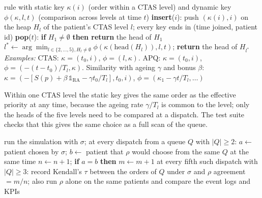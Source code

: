 \begin{algorithm}[H]
\caption{Queue ordered by a queue rule}
\label{alg:queue}
\begin{algorithmic}[1]
\REQUIRE rule with static key $\kappa(i)$ (order within a CTAS level) and dynamic key $\phi(\kappa,l,t)$ (comparison across levels at time $t$)
\STATE \textbf{insert}($i$): push $(\kappa(i),i)$ on the heap $H_l$ of the patient's CTAS level $l$; every key ends in (time joined, patient id)
\STATE \textbf{pop}($t$): \textbf{if} $H_1\neq\emptyset$ \textbf{then return} the head of $H_1$ 
\STATE \quad $l^*\leftarrow\arg\min_{l\in\{2,\dots,5\},H_l\neq\emptyset}\phi(\kappa(\text{head}(H_l)),l,t)$; \textbf{return} the head of $H_{l^*}$
\STATE \textit{Examples:} CTAS: $\kappa=(t_0,i)$, $\phi=(l,\kappa)$. APQ: $\kappa=(t_0,i)$, $\phi=(-(t-t_0)/T_l,\kappa)$. Similarity with ageing $\gamma$ and bonus $\beta$: $\kappa=(-[S(p)+\beta\,\mathbb{1}_{\text{RA}}-\gamma t_0/T_l],t_0,i)$, $\phi=(\kappa_1-\gamma t/T_l,\dots)$
\end{algorithmic}
\end{algorithm}

Within one CTAS level the static key gives the same order as the effective priority at any time, because the ageing rate $\gamma/T_l$ is common to the level; only the heads of the five levels need to be compared at a dispatch. The test suite checks that this gives the same choice as a full scan of the queue.

\begin{algorithm}[H]
\caption{Decision-level fidelity of a similarity index $\sigma$ to a reference rule $\rho$}
\label{alg:fidelity}
\begin{algorithmic}[1]
\STATE run the simulation with $\sigma$; at every dispatch from a queue $Q$ with $|Q|\ge2$:
\STATE \quad $a\leftarrow$ patient chosen by $\sigma$; $b\leftarrow$ patient that $\rho$ would choose from the same $Q$ at the same time
\STATE \quad $n\leftarrow n+1$; \textbf{if} $a=b$ \textbf{then} $m\leftarrow m+1$
\STATE \quad at every fifth such dispatch with $|Q|\ge3$: record Kendall's $\tau$ between the orders of $Q$ under $\sigma$ and $\rho$
\STATE agreement $=m/n$; also run $\rho$ alone on the same patients and compare the event logs and KPIs
\end{algorithmic}
\end{algorithm}
